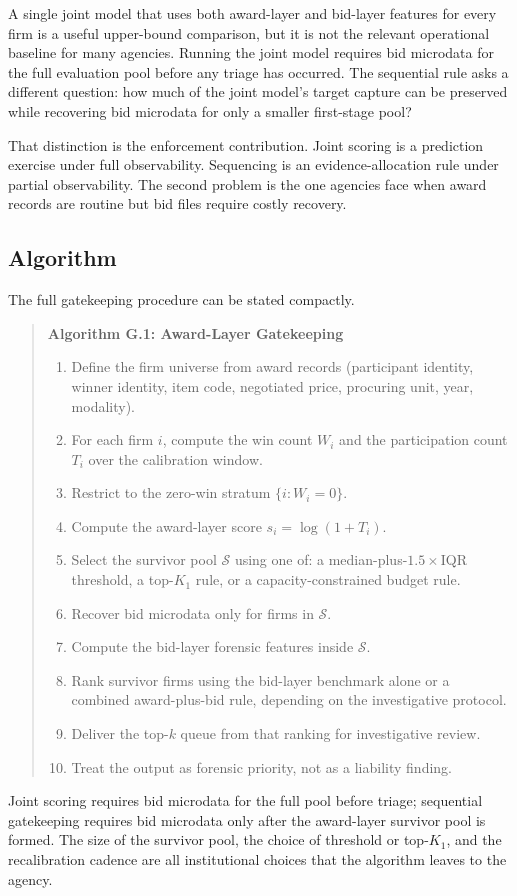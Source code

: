 A single joint model that uses both award-layer and bid-layer
features for every firm is a useful upper-bound comparison, but
it is not the relevant operational baseline for many agencies.
Running the joint model requires bid microdata for the full
evaluation pool before any triage has occurred. The sequential
rule asks a different question: how much of the joint model's
target capture can be preserved while recovering bid microdata
for only a smaller first-stage pool?

That distinction is the enforcement contribution. Joint scoring
is a prediction exercise under full observability. Sequencing is
an evidence-allocation rule under partial observability. The
second problem is the one agencies face when award records are
routine but bid files require costly recovery.

\subsection{Algorithm}
\label{app:gatekeeping_algorithm_submission}

The full gatekeeping procedure can be stated compactly.

\begin{quote}
\textbf{Algorithm G.1: Award-Layer Gatekeeping}
\begin{enumerate}
\item Define the firm universe from award records (participant
identity, winner identity, item code, negotiated price,
procuring unit, year, modality).
\item For each firm $i$, compute the win count $W_i$ and the
participation count $T_i$ over the calibration window.
\item Restrict to the zero-win stratum $\{i : W_i = 0\}$.
\item Compute the award-layer score $s_i = \log(1+T_i)$.
\item Select the survivor pool $\mathcal{S}$ using one of: a
median-plus-$1.5\times$IQR threshold, a top-$K_1$ rule, or a
capacity-constrained budget rule.
\item Recover bid microdata only for firms in $\mathcal{S}$.
\item Compute the bid-layer forensic features inside
$\mathcal{S}$.
\item Rank survivor firms using the bid-layer benchmark alone
or a combined award-plus-bid rule, depending on the
investigative protocol.
\item Deliver the top-$k$ queue from that ranking for
investigative review.
\item Treat the output as forensic priority, not as a liability
finding.
\end{enumerate}
\end{quote}

Joint scoring requires bid microdata for the full pool before
triage; sequential gatekeeping requires bid microdata only
after the award-layer survivor pool is formed. The size of the
survivor pool, the choice of threshold or top-$K_1$, and the
recalibration cadence are all institutional choices that the
algorithm leaves to the agency.
